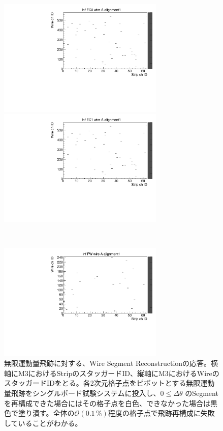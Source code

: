 \begin{figure}
    \begin{minipage}[b]{.5\linewidth}
        \centering
        \includegraphics[height=5.6cm]{fig/Test/A_InfEC0_wire.pdf}
    \end{minipage}
    \begin{minipage}[b]{.5\linewidth}
        \centering
        \includegraphics[height=5.6cm]{fig/Test/A_InfEC1_wire.pdf}
    \end{minipage}\\
    \begin{minipage}[b]{\linewidth}
        \centering
        \includegraphics[height=5.6cm]{fig/Test/A_InfFW_wire.pdf}
    \end{minipage}
    \caption[無限運動量飛跡に対する、Wire Segment Reconstructionの応答]{無限運動量飛跡に対する、Wire Segment Reconstructionの応答。横軸にM3におけるStripのスタッガードID、縦軸にM3におけるWireのスタッガードIDをとる。各2次元格子点をピボットとする無限運動量飛跡をシングルボード試験システムに投入し、$0 \leq \Delta\theta$ のSegmentを再構成できた場合にはその格子点を白色、できなかった場合は黒色で塗り潰す。全体の$\mathcal{O}(0.1\,\%)$程度の格子点で飛跡再構成に失敗していることがわかる。}
    \label{Inf_A_Wire}
\end{figure}


